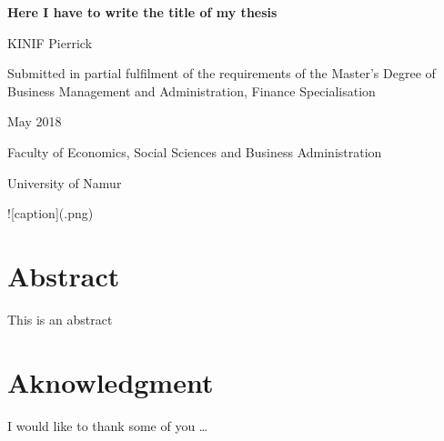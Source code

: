 \documentclass[12pt,]{article}
\title{}
\author{}
\date{}
\begin{document}

\begin{centering}

\vspace{3 cm}

\Huge

{\bf Here I have to write the title of my thesis}

\vspace{3 cm}

\Large
KINIF Pierrick

\vspace{3 cm}


\normalsize
Submitted in partial fulfilment of the requirements of the Master's Degree of Business Management and Administration, Finance Specialisation



May 2018

\vspace{3 cm}

\normalsize

Faculty of Economics, Social Sciences and Business Administration

\normalsize
University of Namur

\vspace{2 cm}


![caption](\figures\UNamur.png)


\end{centering}

\newpage


\section*{Abstract}\label{abstract}

This is an abstract

\newpage

\section*{Aknowledgment}\label{aknowledgment}

I would like to thank some of you \ldots{}

\newpage

\setcounter{tocdepth}{2} \tableofcontents

\newpage

\end{document}
